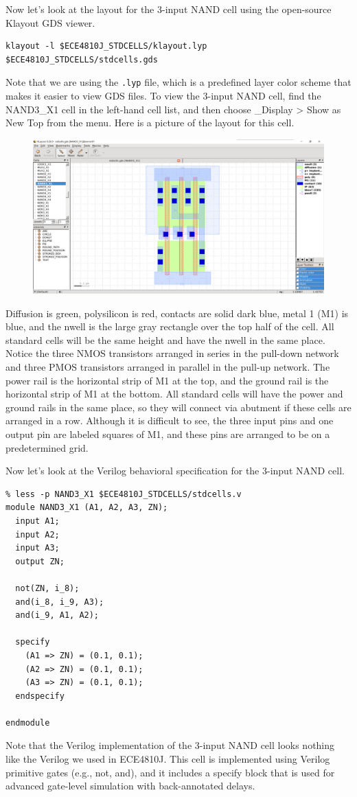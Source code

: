 \documentclass[a4paper,12pt,twoside]{article}
\begin{document}
Now let’s look at the layout for the 3-input NAND cell using the open-source Klayout GDS viewer.
\begin{verbatim}
klayout -l $ECE4810J_STDCELLS/klayout.lyp $ECE4810J_STDCELLS/stdcells.gds
\end{verbatim}
Note that we are using the \texttt{.lyp} file, which is a predefined layer color scheme that makes it easier to view GDS files. To view the 3-input NAND cell, find the NAND3\_X1 cell in the left-hand cell list, and then choose \_Display > Show as New Top from the menu. Here is a picture of the layout for this cell.
\begin{figure}[H]
    \centering
    \includegraphics[width=\textwidth]{images/6.png}
\end{figure}
Diffusion is green, polysilicon is red, contacts are solid dark blue, metal 1 (M1) is blue, and the nwell is the large gray rectangle over the top half of the cell. All standard cells will be the same height and have the nwell in the same place. Notice the three NMOS transistors arranged in series in the pull-down network and three PMOS transistors arranged in parallel in the pull-up network. The power rail is the horizontal strip of M1 at the top, and the ground rail is the horizontal strip of M1 at the bottom. All standard cells will have the power and ground rails in the same place, so they will connect via abutment if these cells are arranged in a row. Although it is difficult to see, the three input pins and one output pin are labeled squares of M1, and these pins are arranged to be on a predetermined grid.

Now let’s look at the Verilog behavioral specification for the 3-input NAND cell.
\begin{verbatim}
% less -p NAND3_X1 $ECE4810J_STDCELLS/stdcells.v
module NAND3_X1 (A1, A2, A3, ZN);
  input A1;
  input A2;
  input A3;
  output ZN;

  not(ZN, i_8);
  and(i_8, i_9, A3);
  and(i_9, A1, A2);

  specify
    (A1 => ZN) = (0.1, 0.1);
    (A2 => ZN) = (0.1, 0.1);
    (A3 => ZN) = (0.1, 0.1);
  endspecify

endmodule
\end{verbatim}
Note that the Verilog implementation of the 3-input NAND cell looks nothing like the Verilog we used in ECE4810J. This cell is implemented using Verilog primitive gates (e.g., not, and), and it includes a specify block that is used for advanced gate-level simulation with back-annotated delays.
\end{document}
